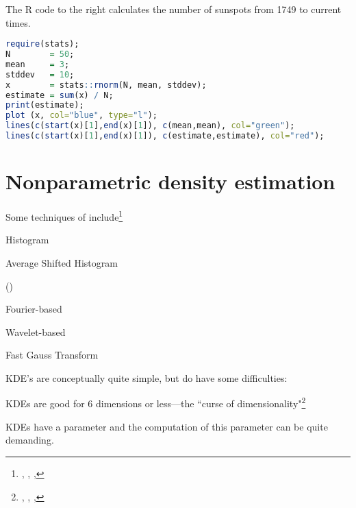 \begin{minipage}{\tw-115mm}
\begin{example}
The R code to the right
calculates the   number of sunspots
from 1749 to current times.
\end{example}
\end{minipage}
\hfill
\begin{minipage}{110mm}
\begin{lstlisting}[language=R]
require(stats);
N        = 50;
mean     = 3;
stddev   = 10;
x        = stats::rnorm(N, mean, stddev);
estimate = sum(x) / N;
print(estimate);
plot (x, col="blue", type="l");
lines(c(start(x)[1],end(x)[1]), c(mean,mean), col="green");
lines(c(start(x)[1],end(x)[1]), c(estimate,estimate), col="red");
\end{lstlisting}
\end{minipage}

\section{Nonparametric density estimation}
Some techniques of  include\footnote{
  ,
  ,
  ,
  }
\begin{listi}
  \item Histogram %
  \item Average Shifted Histogram
  \item {} ()
  \item Fourier-based
  \item Wavelet-based
  \item Fast Gauss Transform
\end{listi}

KDE's are conceptually quite simple, but do have some difficulties:
\begin{listi}
  \item KDEs are good for 6 dimensions or less---the ``curse of dimensionality"\footnote{
        ,
        ,
        ,
        }
  \item KDEs have a  parameter and the computation of this parameter can be quite demanding.
\end{listi}

